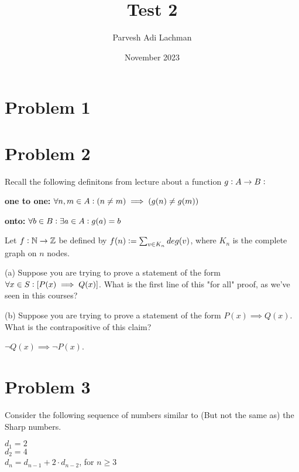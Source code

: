 \documentclass{article}
\title{Test 2}
\author{Parvesh Adi Lachman}
\date{November 2023}
\begin{document}
\maketitle

\section{Problem 1}








\section{Problem 2}

\noindent Recall the following definitons from lecture about a function $g\vcentcolon A\rightarrow B\vcentcolon$\vspace{10pt}

\vspace{10pt}
\noindent\textbf{one to one:} $\forall n,m\in A\vcentcolon (n\neq m)\implies (g(n)\neq g(m))$

\vspace{10pt}
\noindent\textbf{onto:} $\forall b\in B\vcentcolon \exists a\in A\vcentcolon g(a)=b$
\vspace{10pt}


\noindent Let $f\vcentcolon\mathbb{N}\rightarrow\mathbb{Z}$ be defined by $f(n)\vcentcolon = \sum_{v\in K_n} deg(v)$, where $K_n$ is the complete graph on $n$ nodes.
\vspace{10pt}

(a) Suppose you are trying to prove a statement of the form $\forall x\in S\vcentcolon [P(x)\implies Q(x)]$.  What is the first line of this "for all" proof, as we've seen in this courses? \vspace{10pt} 


(b) Suppose you are trying to prove a statement of the form $P(x)\implies Q(x)$. What is the contrapositive of this claim? \vspace{10pt}


\hspace{5pt} $\neg Q(x)\implies\neg P(x)$. \vspace{10pt}




\pagebreak

\section{Problem 3}
\noindent Consider the following sequence of numbers similar to (But not the same as) the Sharp numbers.
\begin{center}
	\begin{minipage}{0.5\textwidth}
		$d_1=2$ \\
		$d_2=4$ \\
		$d_n=d_{n-1}+2\cdot d_{n-2}$, for $n\geq 3$ \\
	\end{minipage}
\end{center}
\end{document}
